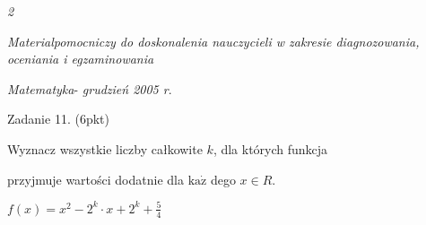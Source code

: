 \documentclass[a4paper,12pt]{article}
\begin{document}
{\it 2}

{\it Materialpomocniczy do doskonalenia nauczycieli w zakresie diagnozowania, oceniania i egzaminowania}

{\it Matematyka}- {\it grudzień 2005 r}.

Zadanie 11. (6pkt)

Wyznacz wszystkie liczby całkowite $k$, dla których funkcja

przyjmuje wartości dodatnie dla $\mathrm{k}\mathrm{a}\dot{\mathrm{z}}$ dego $x\in R.$

$f(x)=x^{2}-2^{k}\displaystyle \cdot x+2^{k}+\frac{5}{4}$
\end{document}
